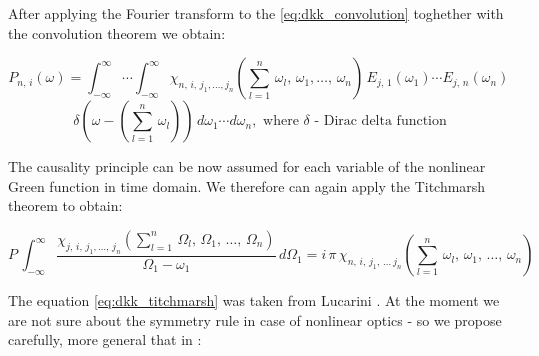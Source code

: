 \documentclass[12pt,twoside,a4paper]{article}
\numberwithin{equation}{subsection}
\numberwithin{figure}{subsection}
\begin{document}
After applying the Fourier transform to the \ref{eq:dkk_convolution} toghether with the convolution theorem we obtain:

\begin{equation} \label{eq:dkk_fapplied}
  {P_{n, \,i}}(\omega )=\int_{ - \infty }^{\infty } \dotsi\int_{ - \infty}^{\infty }{\chi_{n, \,i,
  \,{j_{1}}, \dotsc,{j_{n}}}}(\sum_{l=1}^{n}\,{\omega_{l}}, \,{\omega_{1}},\dotsc,\,{\omega_{n}
  })\,{E_{j, \,1}}({\omega_{1}})\dotsm {E_{j,\,n}}({\omega_{n}}) \, 
\end{equation}
\begin{equation*}
  \delta (\omega - (\sum_{l=1}^{n}\,{\omega_{l}}))\,d{\omega_{1}}\dotsm d{\omega_{n}}, 
  \mbox { where $\delta$ - Dirac delta   function}
\end{equation*}

The causality principle can be now assumed for each variable of the nonlinear Green function in time domain. We therefore can again
apply the Titchmarsh theorem to obtain:

\begin{equation} \label{eq:dkk_titchmarsh}
  P\,\int_{ - \infty }^{\infty }\frac {{\chi_{j, \,i, \,{j_{1}}, \dotsc, \,{j_{n}}}}(\sum_{l=1}^{n}\,
  {\Omega_{l}}, \,{\Omega_{1}},\,\dotsc, \,{\Omega_{n}})}{{\Omega_{1}} - {\omega_{1}}}
  \,d{\Omega_{1}}=i\,\pi \,{\chi_{n, \,i, \,{j_{1}},\,\dotsc \,{j_{n}}}}(\sum_{l=1}^{n}\,{\omega_{l}}, \,{\omega_{1}},
  \,\dotsc, \,{\omega_{n}})
\end{equation}

The equation \ref{eq:dkk_titchmarsh} was taken from Lucarini \cite{lucarini_kramers}. At the moment we are not sure about the
symmetry rule in case of nonlinear optics - so we propose carefully, more general that in \cite{lucarini_kramers}:
\end{document}

